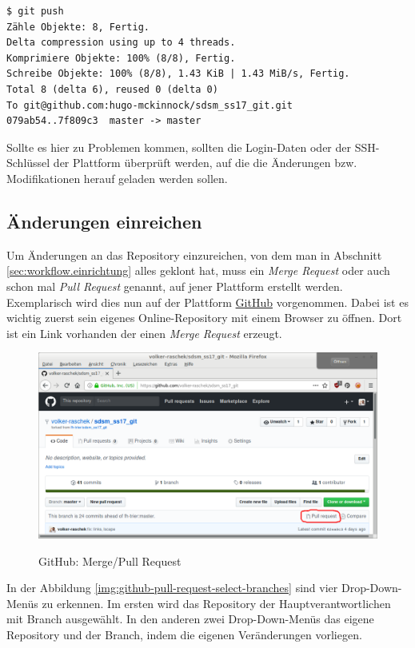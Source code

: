 \begin{verbatim}
$ git push
Zähle Objekte: 8, Fertig.
Delta compression using up to 4 threads.
Komprimiere Objekte: 100% (8/8), Fertig.
Schreibe Objekte: 100% (8/8), 1.43 KiB | 1.43 MiB/s, Fertig.
Total 8 (delta 6), reused 0 (delta 0)
To git@github.com:hugo-mckinnock/sdsm_ss17_git.git
079ab54..7f809c3  master -> master
\end{verbatim}

\begin{info-popup}
  Sollte es hier zu Problemen kommen, sollten die Login-Daten oder der SSH-Schlüssel der Plattform überprüft werden, auf die die Änderungen bzw. Modifikationen herauf geladen werden sollen.
\end{info-popup}


\subsection{Änderungen einreichen}
\label{sec:work-with-git.send-merge-request}
Um Änderungen an das Repository einzureichen, von dem man in Abschnitt \ref{sec:workflow.einrichtung} alles geklont hat, muss ein \textit{Merge Request} oder auch schon mal \textit{Pull Request} genannt, auf jener Plattform erstellt werden. Exemplarisch wird dies nun auf der Plattform \href{https://github.com}{GitHub} vorgenommen. Dabei ist es wichtig zuerst sein eigenes Online-Repository mit einem Browser zu öffnen. Dort ist ein Link vorhanden der einen \textit{Merge Request} erzeugt.

\begin{figure}[H]
  \centering
  \includegraphics[width=1\textwidth]{img//pull-request.png}
  \label{img:github-pull-request}
  \caption{GitHub: Merge/Pull Request}
\end{figure}

In der Abbildung \ref{img:github-pull-request-select-branches} sind vier Drop-Down-Menüs zu erkennen. Im ersten wird das Repository der Hauptverantwortlichen mit Branch ausgewählt. In den anderen zwei Drop-Down-Menüs das eigene Repository und der Branch, indem die eigenen Veränderungen vorliegen.

